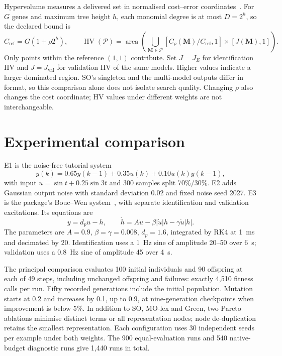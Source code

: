 \documentclass[11pt,a4paper]{article}
\theoremstyle{definition}
\theoremstyle{plain}
\theoremstyle{remark}
\newcommand{\M}{\mathbf{M}}
\newcommand{\HV}{\operatorname{HV}}
\begin{document}
Hypervolume measures a delivered set in normalised cost--error coordinates~\cite{ZT1999}. For $G$ genes and maximum tree height $h$, each monomial degree is at most $D=2^h$, so the declared bound is
\begin{equation}
C_{\mathrm{ref}}=G(1+\rho 2^h),\qquad
\HV(\mathcal P)=\operatorname{area}\!\left(
\bigcup_{\M\in\mathcal P}
[C_\rho(\M)/C_{\mathrm{ref}},1]\times[J(\M),1]\right).
\label{eq:hv}
\end{equation}
Only points within the reference $(1,1)$ contribute. Set $J=J_E$ for identification HV and $J=J_{\mathrm{val}}$ for validation HV of the same models. Higher values indicate a larger dominated region. SO's singleton and the multi-model outputs differ in format, so this comparison alone does not isolate search quality. Changing $\rho$ also changes the cost coordinate; HV values under different weights are not interchangeable.

\section{Experimental comparison}
E1 is the noise-free tutorial system
\begin{equation}
y(k)=0.65y(k-1)+0.35u(k)+0.10u(k)y(k-1),\label{eq:tutorial}
\end{equation}
with input $u=\sin t+0.25\sin3t$ and 300 samples split 70\%/30\%. E2 adds Gaussian output noise with standard deviation 0.02 and fixed noise seed 2027. E3 is the package's Bouc--Wen system~\cite{IR2007}, with separate identification and validation excitations. Its equations are
\begin{equation}
y=d_pu-h,\qquad
\dot h=A\dot u-\beta|\dot u|h-\gamma\dot u|h|.
\label{eq:boucwen}
\end{equation}
The parameters are $A=0.9$, $\beta=\gamma=0.008$, $d_p=1.6$, integrated by RK4 at 1~ms and decimated by 20. Identification uses a 1~Hz sine of amplitude 20--50 over 6~s; validation uses a 0.8~Hz sine of amplitude 45 over 4~s.


The principal comparison evaluates 100 initial individuals and 90 offspring at each of 49 steps, including unchanged offspring and failures: exactly 4,510 fitness calls per run. Fifty recorded generations include the initial population. Mutation starts at 0.2 and increases by 0.1, up to 0.9, at nine-generation checkpoints when improvement is below 5\%. In addition to SO, MO-lex and Green, two Pareto ablations minimise distinct terms or all representation nodes; node de-duplication retains the smallest representation. Each configuration uses 30 independent seeds per example under both weights. The 900 equal-evaluation runs and 540 native-budget diagnostic runs give 1,440 runs in total.
\end{document}
